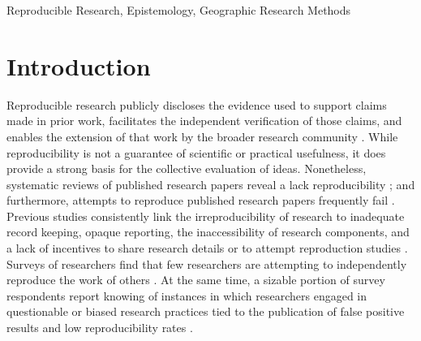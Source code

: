 \documentclass[]{interact}
\newcommand{\citep}{\parencite}
\theoremstyle{plain}%
\theoremstyle{definition}
\theoremstyle{remark}
\begin{document}
\begin{keywords}
Reproducible Research, Epistemology, Geographic Research Methods
\end{keywords}

\newpage
\section*{Introduction}
Reproducible research publicly discloses the evidence used to support claims made in prior work, facilitates the independent verification of those claims, and enables the extension of that work by the broader research community \citep{earp2015, nosek2012scientific, Schmidt2009}.
While reproducibility is not a guarantee of scientific or practical usefulness, it does provide a strong basis for the collective evaluation of ideas.
Nonetheless, systematic reviews of published research papers reveal a lack reproducibility \citep{moraila2014measuring, iqbal2016reproducible}; and furthermore, attempts to reproduce published research papers frequently fail \citep{raghupathi2022reproducibility, chang2015economics}.
Previous studies consistently link the irreproducibility of research to inadequate record keeping, opaque reporting, the inaccessibility of research components, and a lack of incentives to share research details or to attempt reproduction studies \citep{ranstam2000fraud, anderson2007normative, NASEM2019}.
Surveys of researchers find that few researchers are attempting to independently reproduce the work of others \citep{baker20161, boulbes2018survey}.
At the same time, a sizable portion of survey respondents report knowing of instances in which researchers engaged in questionable or biased research practices tied to the publication of false positive results and low reproducibility rates \citep{fanelli2009many, fraser2018questionable}.
\end{document}
